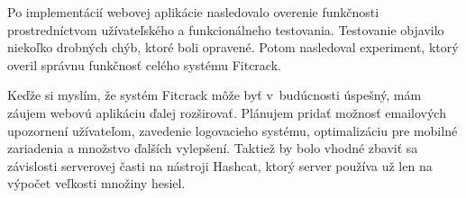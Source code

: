 \documentclass[zadani,slovak]{fitthesis}
\begin{document}
Po implementácií webovej aplikácie nasledovalo overenie funkčnosti prostredníctvom užívateľského a funkcionálneho testovania. Testovanie objavilo niekoľko drobných chýb, ktoré boli opravené. Potom nasledoval experiment, ktorý overil správnu funkčnosť celého systému Fitcrack.

Keďže si myslím, že systém Fitcrack môže byť v~budúcnosti úspešný, mám záujem webovú aplikáciu ďalej rozširovať. Plánujem pridať možnosť emailových upozornení užívateľom, zavedenie logovacieho systému, optimalizáciu pre mobilné zariadenia a množstvo ďalších vylepšení. Taktiež by bolo vhodné zbaviť sa závislosti serverovej časti na nástroji Hashcat, ktorý server používa už len na výpočet veľkosti množiny hesiel.


\ifslovak
  \makeatletter
  \def\@openbib@code{\addcontentsline{toc}{chapter}{Literatúra}}
  \makeatother
  
\else
  \ifczech
    \makeatletter
    \def\@openbib@code{\addcontentsline{toc}{chapter}{Literatura}}
    \makeatother
    
  \else 
    \makeatletter
    \def\@openbib@code{\addcontentsline{toc}{chapter}{Bibliography}}
    \makeatother
    
  \fi
\fi
  \begin{flushleft}
  
  \end{flushleft}

  \iftwoside
    \cleardoublepage
  \fi

  \appendix
\ifczech
  \renewcommand{\appendixpagename}{Přílohy}
  \renewcommand{\appendixtocname}{Přílohy}
  \renewcommand{\appendixname}{Příloha}
\fi
\ifslovak
  \renewcommand{\appendixpagename}{Prílohy}
  \renewcommand{\appendixtocname}{Prílohy}
  \renewcommand{\appendixname}{Príloha}
\fi

  
\ifslovak
\else
  \ifczech
  \else
  \fi
\fi
  \startcontents[chapters]
  \setlength{\parskip}{0pt}
  
\end{document}
